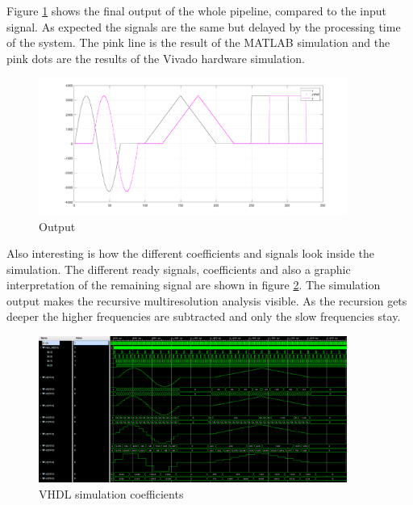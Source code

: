 \begin{refsection}
Figure \ref{fpga:fig:output} shows the final output of the whole pipeline,  compared to the input signal. 
As expected the signals are the same but delayed by the processing time of the system.
The pink line is the result of the MATLAB simulation and the pink dots are the results of the Vivado hardware simulation. 
\begin{figure}[h]
	\centering
	\includegraphics[width=0.9\textwidth]{papers/fpga/images/output.pdf}
	\caption{Output \label{fpga:fig:output}}
\end{figure}

Also interesting is how the different coefficients and signals look inside the simulation.
The different ready signals, coefficients and also a graphic interpretation of the remaining signal are shown in figure \ref{fpga:fig:sim}.
The simulation output makes the recursive multiresolution analysis visible. 
As the recursion gets deeper the higher frequencies are subtracted and only the slow frequencies stay.
\begin{figure}[h]
	\centering
	\includegraphics[width=0.9\textwidth]{papers/fpga/images/inv_branching_screenshot.PNG}
	\caption{VHDL simulation coefficients \label{fpga:fig:sim}}
\end{figure}

\newpage


\end{refsection}
